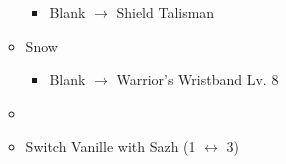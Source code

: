 \begin{menu}
\begin{itemize}
\begin{itemize}
\begin{itemize}
				      \item Blank $\rightarrow$ Shield Talisman
			      \end{itemize}
			\item Snow
			      \begin{itemize}
				      \item Blank $\rightarrow$ Warrior's Wristband Lv. 8
			      \end{itemize}
		\end{itemize}
		\paradigm
		\begin{itemize}
			\item {}%
			      {\paradigmline{(\com)}{(\com)}{\com}}%
			      {\paradigmline[2]{\textit{(\com)}}{\textit{(\com)}}{\textit{\com}}}%
			      {\paradigmline{(\sab)}{\sen}{\syn}}%
			      {\paradigmline{\med}{\rav}{[\syn]}}%
			      {\paradigmline{\med}{\rav}{[\rav]}}%
			      {\paradigmline{[\rav]}{\rav}{\rav}}
			\item Switch Vanille with Sazh (1 $\leftrightarrow$ 3)
		\end{itemize}
	\end{itemize}
\end{menu}

\renewcommand{\first}{[1] Cerberus (\com/\com/\com)}
\renewcommand{\second}{[2] Cerberus (\com/\com/\com)}
\renewcommand{\third}{[3] Premeditation (\syn/\sen/\sab)}
\renewcommand{\fourth}{[4] Coordination (\syn/\rav/\med)}
\renewcommand{\fifth}{[5] Thaumaturgy (\rav/\rav/\med)}
\renewcommand{\sixth}{[6] Tri-Disaster (\rav/\rav/\rav)}

